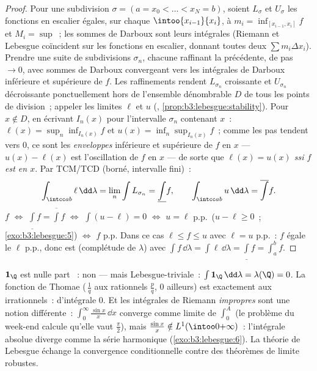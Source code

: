 \begin{proof}
Pour une subdivision $\sigma = (a = x_0 < \dots < x_N =
b)$, soient $L_\sigma$ et $U_\sigma$ les fonctions en
escalier égales, sur chaque $\intoo{x_{i-1}}{x_i}$, à $m_i
= \inf_{[x_{i-1}, x_i]}f$ et $M_i = \sup$~; les sommes de
Darboux sont leurs intégrales (Riemann et Lebesgue
coïncident sur les fonctions en escalier, donnant toutes
deux $\sum m_i\Delta x_i$). Prendre une suite de
subdivisions $\sigma_n$, chacune raffinant la précédente, de
pas $\to 0$, avec sommes de Darboux convergeant vers les
intégrales de Darboux inférieure et supérieure de $f$. Les
raffinements rendent $L_{\sigma_n}$ croissante et
$U_{\sigma_n}$ décroissante ponctuellement hors de
l'ensemble dénombrable $D$ de tous les points de division~;
appeler les limites $\ell$ et $u$ (,
\cref{prop:b3:lebesgue:stability}). Pour $x \notin D$, en
écrivant $I_n(x)$ pour l'intervalle  $\sigma_n$
contenant $x$~: $\ell(x) = \sup_n\inf_{I_n(x)}f$ et $u(x) =
\inf_n\sup_{I_n(x)}f$~; comme les pas tendent vers $0$, ce
sont les \emph{enveloppes} inférieure et supérieure de $f$
en $x$ --- $u(x) - \ell(x)$ est l'oscillation de $f$ en $x$
--- de sorte que \emph{$\ell(x) = u(x)$ ssi $f$ est 
en $x$}. Par TCM/TCD (borné, intervalle fini)~:
\[
\int_{\intcc ab}\ell\,\dd\lambda = \lim_n\int L_{\sigma_n}
= \underline{\int}f,
\qquad
\int_{\intcc ab}u\,\dd\lambda = \overline{\int}f .
\]
$f$  $\iff$ $\underline\int f =
\overline\int f$ $\iff$ $\int(u - \ell) = 0$ $\iff$ $u =
\ell$ p.p.\ ($u - \ell \geq 0$~; \cref{exo:b3:lebesgue:5})
$\iff$ $f$  p.p. Dans ce cas $\ell \leq f \leq u$
avec $\ell = u$ p.p.~: $f$ égale le  $\ell$ p.p.,
donc est  (complétude de $\lambda$) avec
$\int f\,\dd\lambda = \int\ell\,\dd\lambda =
\underline\int f = \int_a^bf$.
\end{proof}

\begin{example}\label{ex:b3:lebesgue:riemannexamples}
$\mathbf 1_\Q$ est nulle part ~: non
 --- mais Lebesgue-triviale~: $\int\mathbf
1_\Q\,\dd\lambda = \lambda(\Q) = 0$. La fonction de Thomae
(\,$\frac1q$ aux rationnels $\frac pq$, $0$ ailleurs) est
 exactement aux irrationnels~:
 d'intégrale $0$. Et les intégrales de
Riemann \emph{impropres} sont une notion différente~:
$\int_0^\infty\frac{\sin x}x\,\dd x$ converge comme limite de
$\int_0^A$ (le problème du week-end calcule qu'elle vaut
$\frac\pi2$), mais $\frac{\sin x}x \notin
L^1(\intoo0{+\infty})$~: l'intégrale absolue diverge comme
la série harmonique (\cref{exo:b3:lebesgue:6}). La théorie
de Lebesgue échange la convergence conditionnelle contre des
théorèmes de limite robustes.
\end{example}

